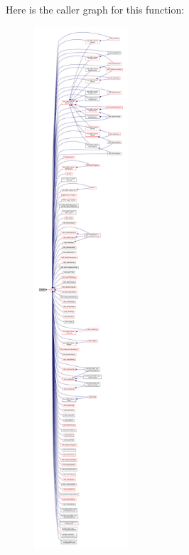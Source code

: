 Here is the caller graph for this function\+:
\nopagebreak
\begin{figure}[H]
\begin{center}
\leavevmode
\includegraphics[height=550pt]{db/d3b/recipes_8h_a623fec796d9d53e5e4a4d30226547da7_icgraph}
\end{center}
\end{figure}


